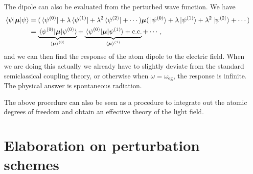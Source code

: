\documentclass[hyperref, a4paper]{article}
\begin{document}
The dipole can also be evaluated from the perturbed wave function.
We have 
\begin{equation}
    \begin{aligned}
        \expval*{\vb*{\mu}}{\psi} &= 
            (\bra*{\psi^{(0)}} + \lambda \bra*{\psi^{(1)}} + \lambda^2 \bra*{\psi^{(2)}} + \cdots)
            \vb*{\mu} (\ket*{\psi^{(0)}} + \lambda \ket*{\psi^{(1)}} + \lambda^2 \ket*{\psi^{(2)}} + \cdots) \\
        &= \underbrace{
            \expval*{\vb*{\mu}}{\psi^{(0)}}
        }_{\expval{\vb*{\mu}}^{(0)}}  + 
        \underbrace{
            \mel*{\psi^{(0)}}{\vb*{\mu}}{\psi^{(1)}} + \text{c.c.}
        }_{\expval*{\vb*{\mu}}^{(1)}} + \cdots,
    \end{aligned}
\end{equation} 
and we can then find the response of the atom dipole to the electric field.
When we are doing this actually we already have to 
slightly deviate from the standard semiclassical coupling theory,
or otherwise when $\omega = \omega_{\text{eg}}$, 
the response is infinite.
The physical answer is spontaneous radiation.

The above procedure can also be seen as a procedure 
to integrate out the atomic degrees of freedom and  
obtain an effective theory of the light field.


\section{Elaboration on perturbation schemes}
\end{document}
